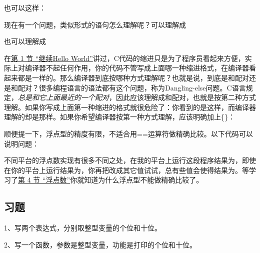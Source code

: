 也可以这样：




现在有一个问题，类似形式的语句怎么理解呢？可以理解成




也可以理解成




在\hyperlink{db.ch02s01.id2707148}{第 1 节 “继续Hello World”}讲过，C代码的缩进只是为了程序员看起来方便，实际上对编译器不起任何作用，你的代码不管写成上面哪一种缩进格式，在编译器看起来都是一样的。那么编译器到底按哪种方式理解呢？也就是说，到底是和配对还是和配对？很多编程语言的语法都有这个问题，称为Dangling-else问题。C语言规定，\emph{总是和它上面最近的一个配对}，因此应该理解成和配对，也就是按第二种方式理解。如果你写成上面第一种缩进的格式就很危险了：你看到的是这样，而编译器理解的却是那样。如果你希望编译器按第一种方式理解，应该明确加上\{\}：




顺便提一下，浮点型的精度有限，不适合用==运算符做精确比较。以下代码可以说明问题：




不同平台的浮点数实现有很多不同之处，在我的平台上运行这段程序结果为，即使在你的平台上运行结果为，你再把改成其它值试试，总有些值会使得结果为。等学习了\hyperlink{db.ch14s04.id2754181}{第 4 节 “浮点数”}你就知道为什么浮点型不能做精确比较了。


\subsection*{习题}
%


1、写两个表达式，分别取整型变量的个位和十位。



2、写一个函数，参数是整型变量，功能是打印的个位和十位。




